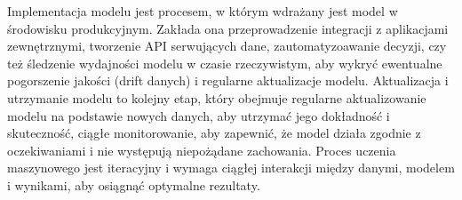 Implementacja modelu jest procesem, w którym wdrażany jest model w środowisku produkcyjnym.
Zakłada ona przeprowadzenie integracji z aplikacjami zewnętrznymi, tworzenie API serwujących dane,
zautomatyzoawanie decyzji, czy też śledzenie wydajności modelu w czasie rzeczywistym,
aby wykryć ewentualne pogorszenie jakości (drift danych) i regularne aktualizacje modelu.
Aktualizacja i utrzymanie modelu to kolejny etap,
który obejmuje regularne aktualizowanie modelu na podstawie nowych danych,
aby utrzymać jego dokładność i skuteczność, ciągłe monitorowanie,
aby zapewnić, że model działa zgodnie z oczekiwaniami i nie występują niepożądane zachowania.
Proces uczenia maszynowego jest iteracyjny i wymaga ciągłej interakcji między danymi,
modelem i wynikami, aby osiągnąć optymalne rezultaty.